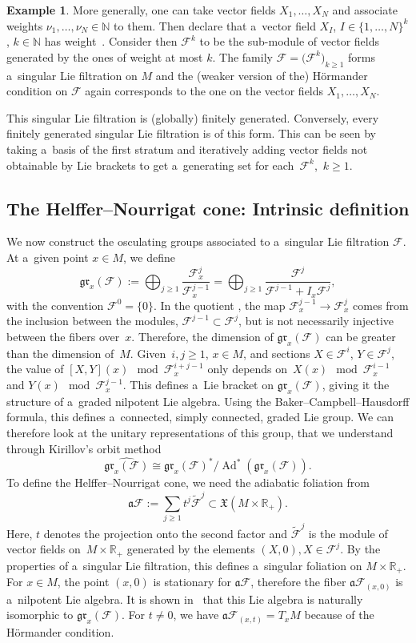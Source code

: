 \documentclass[pdftex]{sigma}
\newcommand{\R}{\mathbb R} %
\newcommand{\N}{\mathbb N} %
\newcommand{\F}{\mathcal{F}} %
\newcommand{\Ad}{\operatorname{Ad}} %
\newcommand{\adiab}{\mathfrak{a}} %
\newcommand{\Fb}{\mathcal{F}} %
\newcommand{\gr}{\mathfrak{gr}} %
\numberwithin{equation}{section}
\theoremstyle{definition}
\newtheorem{ex}[thm]{Example}
\begin{document}
\begin{ex}\label{Example : Finitely generated}
 More generally, one can take vector fields $X_1, \dots, X_N$ and associate weights $\nu_1,\dots,\nu_N \in \N$ to them. Then declare that a~vector field $X_I$, $I\in \{1,\dots,N\}^k$, $k\in \N$ has weight~. Consider then $\F^k$ to be the sub-module of vector fields generated by the ones of weight at most $k$. The family $\F = \bigl(\F^k\bigr)_{k\geq 1}$ forms a~singular Lie filtration on $M$ and the (weaker version of the) H\"ormander condition on $\F$ again corresponds to the one on the vector fields $X_1, \dots, X_N$.

 This singular Lie filtration is (globally) finitely generated. Conversely, every finitely generated singular Lie filtration is of this form. This can be seen by taking a~basis of the first stratum and iteratively adding vector fields not obtainable by Lie brackets to get a~generating set for each~$\F^k$,~$k\geq 1$.
\end{ex}


\subsection{The Helffer--Nourrigat cone: Intrinsic definition}

We now construct the osculating groups associated to a~singular Lie filtration $\Fb$. At a~given point $x\in M$, we define
\[\gr_x(\Fb):= \bigoplus_{j\geq 1} \frac{\F^j_x}{\F^{j-1}_x} = \bigoplus_{j\geq 1} \frac{\F^j}{\F^{j-1} + I_x\F^j},\]
with the convention $\F^0 = \{0\}$.
In the quotient \smash{$\frac{\F^j_x}{\F^{j-1}_x}$}, the map $\F^{j-1}_x \to \F^j_x$ comes from the inclusion between the modules, $\F^{j-1}\subset \F^j$, but is not necessarily injective between the fibers over~$x$. Therefore, the dimension of $\gr_x(\Fb)$ can be greater than the dimension of~$M$.
Given~${i,j\geq 1}$, $x\in M$, and sections $X\in \F^i$, $Y\in \F^j$, the value of $[X,Y](x) \mod \F_x^{i+j-1}$ only depends on~${X(x) \mod \F_x^{i-1}}$ and $Y(x) \mod \F_x^{j-1}$. This defines a~Lie bracket on $\gr_x(\Fb)$, giving it the structure of a~graded nilpotent Lie algebra. Using the Baker--Campbell--Hausdorff formula, this defines a~connected, simply connected, graded Lie group. We can therefore look at the unitary representations of this group, that we understand through Kirillov's orbit method~\cite{Kirillov}
\[\widehat{\gr_x(\Fb)} \cong {\gr_x(\Fb)^*}/{\Ad^*(\gr_x(\Fb))}.\]
To define the Helffer--Nourrigat cone, we need the adiabatic foliation from~\cite{AMYMaximalHypoellipticity}
\[\adiab\F := \sum_{j\geq 1} t^j\widetilde{\F}^j \subset \mathfrak{X}(M\times \R_+).\]
Here, $t$ denotes the projection onto the second factor and $\widetilde{\F}^j$ is the module of vector fields on~${M\times \R_+}$ generated by the elements $(X,0), X \in \F^j$. By the properties of a~singular Lie filtration, this defines a~singular foliation on $M \times \R_+$. For $x\in M$, the point $(x,0)$ is stationary for $\adiab\F$, therefore the fiber $\adiab\F_{(x,0)}$ is a~nilpotent Lie algebra. It is shown in~\cite[Proposition 1.6]{AMYMaximalHypoellipticity} that this Lie algebra is naturally isomorphic to $\gr_x(\Fb)$. For $t \neq 0$, we have $\adiab\F_{(x,t)} = T_xM$ because of the H\"ormander condition.
\end{document}
